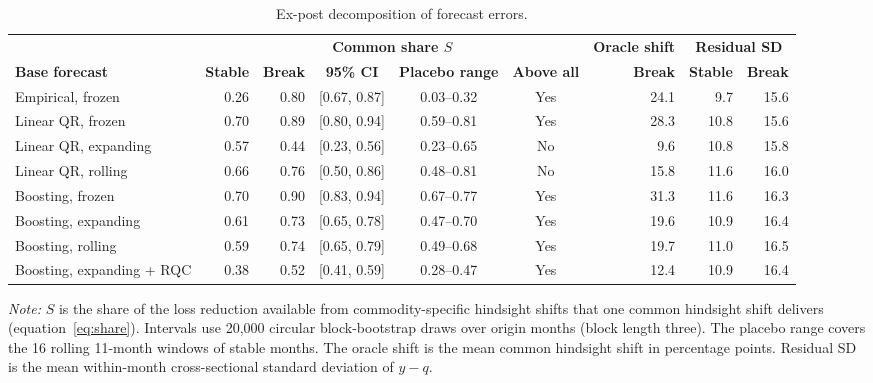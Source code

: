 \begin{table}[t]
\caption{Ex-post decomposition of forecast errors.\label{tab:decomp}}
\centering\footnotesize\setlength{\tabcolsep}{3pt}
\begin{tabular*}{\textwidth}{@{\extracolsep\fill}lrrcccrrr@{}}
\toprule
 & \multicolumn{5}{c}{\textbf{Common share $S$}} & \textbf{Oracle shift} & \multicolumn{2}{c}{\textbf{Residual SD}} \\
\cmidrule(lr){2-6}\cmidrule(lr){7-7}\cmidrule(l){8-9}
\textbf{Base forecast} & \textbf{Stable} & \textbf{Break} & \textbf{95\% CI} & \textbf{Placebo range} & \textbf{Above all} & \textbf{Break} & \textbf{Stable} & \textbf{Break} \\
\midrule
Empirical, frozen & 0.26 & 0.80 & [0.67, 0.87] & 0.03--0.32 & Yes & 24.1 & 9.7 & 15.6 \\
Linear QR, frozen & 0.70 & 0.89 & [0.80, 0.94] & 0.59--0.81 & Yes & 28.3 & 10.8 & 15.6 \\
Linear QR, expanding & 0.57 & 0.44 & [0.23, 0.56] & 0.23--0.65 & No & 9.6 & 10.8 & 15.8 \\
Linear QR, rolling & 0.66 & 0.76 & [0.50, 0.86] & 0.48--0.81 & No & 15.8 & 11.6 & 16.0 \\
Boosting, frozen & 0.70 & 0.90 & [0.83, 0.94] & 0.67--0.77 & Yes & 31.3 & 11.6 & 16.3 \\
Boosting, expanding & 0.61 & 0.73 & [0.65, 0.78] & 0.47--0.70 & Yes & 19.6 & 10.9 & 16.4 \\
Boosting, rolling & 0.59 & 0.74 & [0.65, 0.79] & 0.49--0.68 & Yes & 19.7 & 11.0 & 16.5 \\
Boosting, expanding + RQC & 0.38 & 0.52 & [0.41, 0.59] & 0.28--0.47 & Yes & 12.4 & 10.9 & 16.4 \\
\bottomrule
\end{tabular*}
\begin{tablenotes}
\item \textit{Note:} $S$ is the share of the loss reduction available from commodity-specific hindsight shifts that one common hindsight shift delivers (equation~\ref{eq:share}). Intervals use 20,000 circular block-bootstrap draws over origin months (block length three). The placebo range covers the 16 rolling 11-month windows of stable months. The oracle shift is the mean common hindsight shift in percentage points. Residual SD is the mean within-month cross-sectional standard deviation of $y-q$.
\end{tablenotes}
\end{table}
